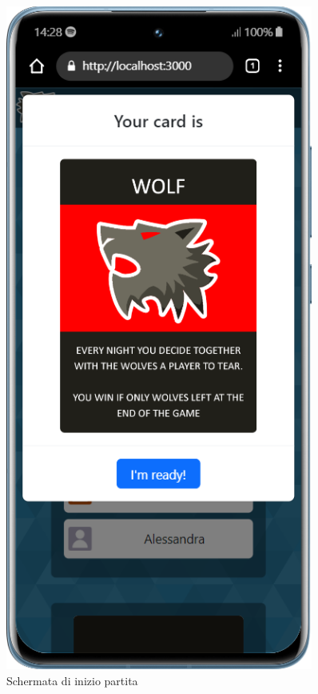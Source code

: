 \begin{figure}[H]
    \centering
    \begin{minipage}{0.45\textwidth}
        \centering
        \includegraphics[width=0.9\textwidth]{img/screen/mobile/card_mobile.png}
        \caption{Schermata di inizio partita}
        \label{fig:card_mobile}

\end{minipage}
\end{figure}
